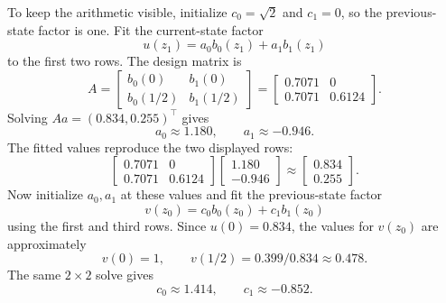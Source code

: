 \documentclass[11pt]{article}
\numberwithin{equation}{section}
\begin{document}
To keep the arithmetic visible, initialize \(c_0=\sqrt2\) and \(c_1=0\), so
the previous-state factor is one.  Fit the current-state factor
\begin{equation}
    u(z_1)=a_0b_0(z_1)+a_1b_1(z_1)
    \label{eq:p25-trace2-7}
\end{equation}
to the first two rows.  The design matrix is
\begin{equation}
    A=
    \begin{bmatrix}
    b_0(0) & b_1(0)\\
    b_0(1/2) & b_1(1/2)
    \end{bmatrix}
    =
    \begin{bmatrix}
    0.7071 & 0\\
    0.7071 & 0.6124
    \end{bmatrix}.
    \label{eq:p25-trace2-8}
\end{equation}
Solving \(Aa=(0.834,0.255)^\top\) gives
\begin{equation}
    a_0\approx1.180,
    \qquad
    a_1\approx-0.946.
    \label{eq:p25-trace2-9}
\end{equation}
The fitted values reproduce the two displayed rows:
\begin{equation}
    \begin{bmatrix}
    0.7071 & 0\\
    0.7071 & 0.6124
    \end{bmatrix}
    \begin{bmatrix}1.180\\-0.946\end{bmatrix}
    \approx
    \begin{bmatrix}0.834\\0.255\end{bmatrix}.
    \label{eq:p25-trace2-9a}
\end{equation}
Now initialize \(a_0,a_1\) at these values and fit the previous-state factor
\begin{equation}
    v(z_0)=c_0b_0(z_0)+c_1b_1(z_0)
    \label{eq:p25-trace2-10}
\end{equation}
using the first and third rows.  Since \(u(0)=0.834\), the values for
\(v(z_0)\) are approximately
\begin{equation}
    v(0)=1,
    \qquad
    v(1/2)=0.399/0.834\approx0.478.
    \label{eq:p25-trace2-11}
\end{equation}
The same \(2\times2\) solve gives
\begin{equation}
    c_0\approx1.414,
    \qquad
    c_1\approx-0.852.
    \label{eq:p25-trace2-12}
\end{equation}
\end{document}
